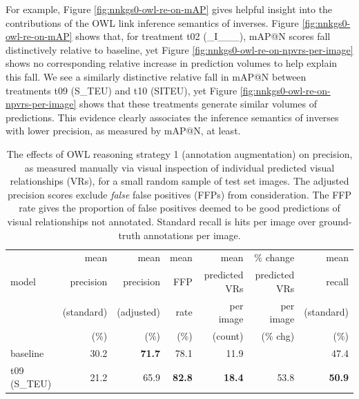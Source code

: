 \documentclass[]{jair}
\begin{document}
For example, Figure \ref{fig:nnkgs0-owl-re-on-mAP} gives helpful insight into the contributions of the OWL link inference semantics of inverses.
Figure \ref{fig:nnkgs0-owl-re-on-mAP} shows that, for treatment t02 (\_I\_\_\_), mAP@N scores fall distinctively relative to baseline, yet Figure \ref{fig:nnkgs0-owl-re-on-npvrs-per-image} shows no corresponding relative increase in prediction volumes to help explain this fall.
We see a similarly distinctive relative fall in mAP@N between treatments t09 (S\_TEU) and t10 (SITEU), yet Figure \ref{fig:nnkgs0-owl-re-on-npvrs-per-image} shows that these treatments generate similar volumes of predictions.
This evidence clearly associates the inference semantics of inverses with lower precision, as measured by mAP@N, at least.

\begin{table}[t]
  \centering
  \footnotesize
  \begin{threeparttable}
  \caption{\footnotesize The effects of OWL reasoning strategy 1 (annotation augmentation) on precision, as  measured manually via visual inspection of individual predicted visual relationships (VRs), for a small random sample of test set images. The adjusted precision scores exclude \emph{false} false positives (FFPs) from consideration. The FFP rate gives the proportion of false positives deemed to be good predictions of visual relationships not annotated. Standard recall is hits per image over ground-truth annotations per image.}
  \label{table:manual-precision-scores}
  \begin{tabular}{lrrrrrr}
    \toprule
            & mean       & mean       & mean       & mean   & \% change & mean \\
     model  & precision  & precision  & FFP  & predicted VRs & predicted VRs & recall \\
            & (standard)  & (adjusted) & rate  & per image & per image & (standard) \\
            & (\%)   &  (\%)  & (\%) & (count) & (\% chg) & (\%) \\
    \midrule
    baseline & 30.2  & \textbf{71.7}  & 78.1 & 11.9 &  & 47.4 \\
    t09 (S\_TEU) & 21.2  & 65.9  & \textbf{82.8} & \textbf{18.4} & 53.8 & \textbf{50.9} \\
    \bottomrule 
  \end{tabular}
  \end{threeparttable}
\end{table}
\end{document}
